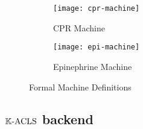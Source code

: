 \begin{figure}[tb]
\centering
\begin{subfigure}{\textwidth}
  \centering
  \texttt{[image: cpr-machine]}
  \caption{CPR Machine}
  \label{fig:cpr-machine}
\end{subfigure}%
\hfill\newline\hfill\newline\hfill
\begin{subfigure}{\textwidth}
  \centering
  \texttt{[image: epi-machine]}
  \caption{Epinephrine Machine}
  \label{fig:epi-machine}
\end{subfigure}
\caption{Formal Machine Definitions}
\label{fig:machine-defs}
\end{figure}

\subsection{$\mathbb{K}{}\text{-ACLS}$ backend}\label{sec:kacls-backend}




